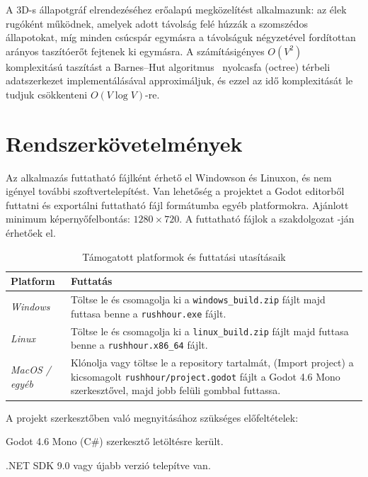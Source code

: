 A 3D-s állapotgráf elrendezéséhez erőalapú megközelítést alkalmazunk: az élek rugóként működnek, amelyek adott távolság felé húzzák a szomszédos állapotokat, míg minden csúcspár egymásra a távolságuk négyzetével fordítottan arányos taszítóerőt fejtenek ki egymásra. A számításigényes $O(V^2)$ komplexitású taszítást a Barnes–Hut algoritmus~\cite{barneshut1986} nyolcasfa (octree) térbeli adatszerkezet implementálásával approximáljuk, és ezzel az idő komplexitását le tudjuk csökkenteni $O(V \log V)$-re.


\section{Rendszerkövetelmények}

Az alkalmazás futtatható fájlként érhető el Windowson és Linuxon, és nem igényel további szoftvertelepítést.
Van lehetőség a projektet a Godot editorből futtatni és exportálni futtatható fájl formátumba egyéb platformokra.
Ajánlott minimum képernyőfelbontás: $1280 \times 720$.
A futtatható fájlok a szakdolgozat \href{https://github.com/SzabiSuli/rushhour/}{}-ján érhetőek el.

\begin{table}[H]
    \centering
    \begin{tabular}{ | m{} | m{} | }
        \hline
        \textbf{Platform} & \textbf{Futtatás} \\
        \hline \hline
        \emph{Windows} & Töltse le és csomagolja ki a \texttt{windows\_build.zip} fájlt majd futtasa benne a \texttt{rushhour.exe} fájlt. \\
        \hline
        \emph{Linux} & Töltse le és csomagolja ki a \texttt{linux\_build.zip} fájlt majd futtasa benne a \texttt{rushhour.x86\_64} fájlt. \\
        \hline
        \emph{MacOS / egyéb} & Klónolja vagy töltse le a repository tartalmát, (Import project) a kicsomagolt \texttt{rushhour/project.godot} fájlt a Godot 4.6 Mono szerkesztővel, majd jobb felüli gombbal futtassa. \\
        \hline
    \end{tabular}
    \caption{Támogatott platformok és futtatási utasításaik}
    \label{tab:platforms}
\end{table}

A projekt szerkesztőben való megnyitásához szükséges előfeltételek:
\begin{compactitem}
    \item Godot 4.6 Mono (C\#) szerkesztő letöltésre került.~\cite{godot_engine}
    \item .NET SDK 9.0 vagy újabb verzió telepítve van.~\cite{dotnet9}
\end{compactitem}

